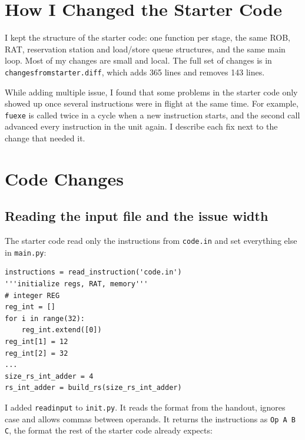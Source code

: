 \documentclass[11pt]{article}
\renewcommand{\_}{\origunderscore\allowbreak}
\begin{document}
\section{How I Changed the Starter Code}

I kept the structure of the starter code: one function per stage, the same ROB, RAT,
reservation station and load/store queue structures, and the same main loop. Most of my changes
are small and local. The full set of changes is in \texttt{changes\_from\_starter.diff}, which
adds 365 lines and removes 143 lines.

While adding multiple issue, I found that some problems in the starter code only showed up once
several instructions were in flight at the same time. For example, \texttt{fu\_exe} is called
twice in a cycle when a new instruction starts, and the second call advanced every instruction
in the unit again. I describe each fix next to the change that needed it.

\section{Code Changes}

\subsection{Reading the input file and the issue width}

The starter code read only the instructions from \texttt{code.in} and set everything else in
\texttt{main.py}:

\begin{lstlisting}
instructions = read_instruction('code.in')
'''initialize regs, RAT, memory''' 
# integer REG
reg_int = []
for i in range(32):
    reg_int.extend([0])
reg_int[1] = 12
reg_int[2] = 32
...
size_rs_int_adder = 4 
rs_int_adder = build_rs(size_rs_int_adder)
\end{lstlisting}

I added \texttt{read\_input} to \texttt{init.py}. It reads the format from the handout, ignores
case and allows commas between operands. It returns the instructions as \texttt{Op A B C}, the
format the rest of the starter code already expects:
\end{document}
